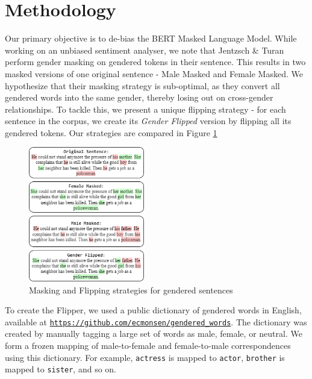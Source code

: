\documentclass[10pt,twocolumn,letterpaper]{article}
\begin{document}
\section{Methodology}
\label{sec:methodology}
Our primary objective is to de-bias the BERT Masked Language Model.
While working on an unbiased sentiment analyser, we note that Jentzsch \& Turan \cite{bias-measure} perform gender masking on gendered tokens in their sentence.
This results in two masked versions of one original sentence - Male Masked and Female Masked.
We hypothesize that their masking strategy is sub-optimal, as they convert all gendered words into the same gender, thereby losing out on cross-gender relationships.
To tackle this, we present a unique flipping strategy - for each sentence in the corpus, we create its \textit{Gender Flipped} version by flipping all its gendered tokens.
Our strategies are compared in Figure \ref{fig:masking}
\begin{figure}
    \centering
    \includegraphics[width=0.45\textwidth]{Assets/masking.png}
    \caption{Masking and Flipping strategies for gendered sentences}
    \label{fig:masking}
\end{figure}

To create the Flipper, we used a public dictionary of gendered words in English, available at \href{https://github.com/ecmonsen/gendered_words}{\texttt{https://github.com/ecmonsen/gendered\_words}}.
The dictionary was created by manually tagging a large set of words as male, female, or neutral.
We form a frozen mapping of male-to-female and female-to-male correspondences using this dictionary.
For example, \texttt{actress} is mapped to \texttt{actor}, \texttt{brother} is mapped to \texttt{sister}, and so on.
\end{document}
